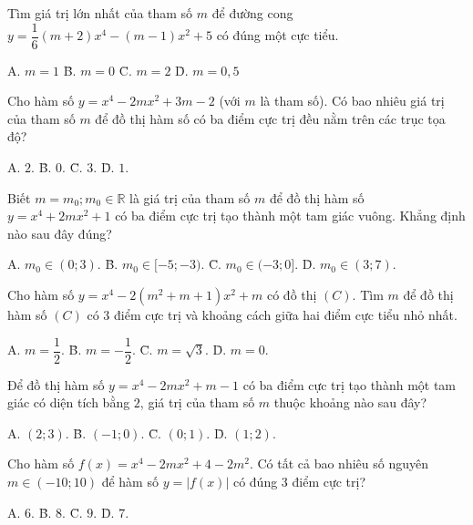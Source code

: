 \vspace{0.3cm}

 Tìm giá trị lớn nhất của tham số $m$ để đường cong $y = \dfrac{1}{6}(m+2)x^4 - (m-1)x^2 + 5$ có đúng một cực tiểu.
\begin{tabbing}
A. $m = 1$ \qquad\qquad\qquad \= B. $m = 0$ \qquad\qquad\qquad \= C. $m = 2$ \qquad\qquad\qquad \= D. $m = 0,5$
\end{tabbing}
 Cho hàm số $y=x^4-2mx^2+3m-2$ (với $m$ là tham số). Có bao nhiêu giá trị của tham số $m$ để đồ thị hàm số có ba điểm cực trị đều nằm trên các trục tọa độ?
\begin{tabbing}
A. $2.$ \qquad\qquad\qquad \= B. $0.$ \qquad\qquad\qquad \= C. $3.$ \qquad\qquad\qquad \= D. $1.$
\end{tabbing}

\vspace{0.3cm}

 Biết $m=m_0; m_0 \in \mathbb{R}$ là giá trị của tham số $m$ để đồ thị hàm số $y=x^4+2mx^2+1$ có ba điểm cực trị tạo thành một tam giác vuông. Khẳng định nào sau đây đúng?
\begin{tabbing}
A. $m_0 \in (0;3).$ \qquad\qquad\qquad \= B. $m_0 \in [-5;-3).$ \qquad\qquad\qquad \= C. $m_0 \in (-3;0].$ \qquad\qquad\qquad \= D. $m_0 \in (3;7).$
\end{tabbing}

\vspace{0.3cm}

 Cho hàm số $y=x^4-2(m^2+m+1)x^2+m$ có đồ thị $(C)$. Tìm $m$ để đồ thị hàm số $(C)$ có $3$ điểm cực trị và khoảng cách giữa hai điểm cực tiểu nhỏ nhất.
\begin{tabbing}
A. $m=\dfrac{1}{2}.$ \qquad\qquad\qquad \= B. $m=-\dfrac{1}{2}.$ \qquad\qquad\qquad \= C. $m=\sqrt{3}.$ \qquad\qquad\qquad \= D. $m=0.$
\end{tabbing}

\vspace{0.3cm}

 Để đồ thị hàm số $y=x^4-2mx^2+m-1$ có ba điểm cực trị tạo thành một tam giác có diện tích bằng $2$, giá trị của tham số $m$ thuộc khoảng nào sau đây?
\begin{tabbing}
A. $(2;3).$ \qquad\qquad\qquad \= B. $(-1;0).$ \qquad\qquad\qquad \= C. $(0;1).$ \qquad\qquad\qquad \= D. $(1;2).$
\end{tabbing}

\vspace{0.3cm}

 Cho hàm số $f(x)=x^4-2mx^2+4-2m^2$. Có tất cả bao nhiêu số nguyên $m \in (-10;10)$ để hàm số $y=|f(x)|$ có đúng $3$ điểm cực trị?
\begin{tabbing}
A. $6.$ \qquad\qquad\qquad \= B. $8.$ \qquad\qquad\qquad \= C. $9.$ \qquad\qquad\qquad \= D. $7.$
\end{tabbing}

\vspace{0.3cm}
\vfill

